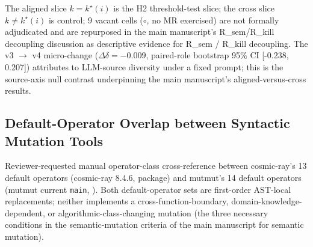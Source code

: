 \documentclass[review,12pt,authoryear]{elsarticle}
\begin{document}
The aligned slice $k = k^\star(i)$ is the H2 threshold-test slice; the
cross slice $k \neq k^\star(i)$
is control; 9 vacant cells ($\circ$, no MR exercised) are not formally
adjudicated and are repurposed in the main manuscript's R\_sem/R\_kill decoupling discussion as descriptive evidence for
R\_sem / R\_kill decoupling. The v3 $\to$ v4 micro-change
($\Delta\delta = -0.009$, paired-role bootstrap 95\% CI [-0.238, 0.207])
attributes to LLM-source diversity under a fixed prompt; this is the
source-axis null contrast underpinning the main manuscript's aligned-versus-cross results.

\subsection{Default-Operator Overlap between Syntactic Mutation Tools}\label{b.6-mutmut-vs-cosmic-ray-default-operator-overlap}

Reviewer-requested manual operator-class cross-reference between
cosmic-ray's 13 default operators (cosmic-ray 8.4.6,
 package) and mutmut's 14 default
operators (mutmut current \texttt{main},
). Both default-operator sets
are first-order AST-local replacements; neither implements a
cross-function-boundary, domain-knowledge-dependent, or
algorithmic-class-changing mutation (the three necessary conditions in the semantic-mutation criteria of the main manuscript
for semantic mutation).
\end{document}
